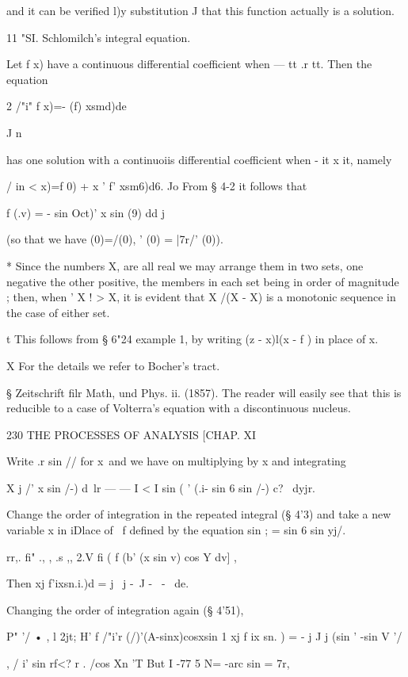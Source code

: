 {and it can be verified l)y substitution J that this function actually is a solution. 

11 "SI. Schlomilch's  integral equation. 

Let f x) have a continuous differential coefficient when — tt  .r   tt. Then the equation 

2 /"i" 
f x)=- (f) xsmd)de 

  J n 

has one solution with a continuoiis differential coefficient when - it  x   it, namely 

/ in 
<  x)=f 0) + x ' f' xsm6)d6. 
Jo 
From § 4-2 it follows that 

f (.v) = - sin Oct)'  x sin (9) dd 
  j 

(so that we have (0)=/(0),  ' (0) = |7r/' (0)). 

* Since the numbers X,  are all real we may arrange them in two sets, one negative the 
other positive, the members in each set being in order of magnitude ; then, when ' X  ! > X, it is 
evident that X /(X  - X) is a monotonic sequence in the case of either set. 

t This follows from § 6"24 example 1, by writing (z - x)l(x - f ) in place of x. 

X For the details we refer to Bocher's tract. 

§ Zeitschrift filr Math, und Phys. ii. (1857). The reader will easily see that this is reducible 
to a case of Volterra's equation with a discontinuous nucleus. 



230 THE PROCESSES OF ANALYSIS [CHAP. XI 

Write .r sin  //  for x\ and we have on multiplying by x and integrating 

X j /'  x sin \//-) d\ lr — — I < I sin  ( ' (.i- sin 6 sin \//-) c?  \ dyjr. 

Change the order of integration in the repeated integral (§ 4'3) and take a new variable x 
in iDlace of \ f  defined by the equation sin ;  = sin 6 sin yj/. 

rr,. fi"  ., ,   .s ,, 2.V fi  ( f   (b' (x sin v) cos Y dv] ,  

Then xj f'ixsn.i.)d = j \ j  -~J -~ - \ de. 

Changing the order of integration again (§ 4'51), 

P" '/ • , l 2jt; H'  f /"i'r (/)'(A-sinx)cosxsin  1 
xj f ix sn.  )   = - j J j   \/(sin ' -sin V  '/    

  , /  i'  sin rf<? r . /cos Xn 'T 
But I -77   5 N= -arc sin = 7r, 

}
